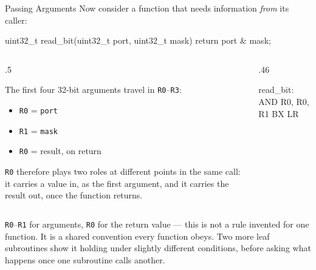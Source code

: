 \documentclass[9pt,aspectratio=169,xcolor=table]{beamer}
\begin{document}
\begin{frame}[fragile]{Passing Arguments}
	\leavevmode
	{\small Now consider a function that needs information \emph{from} its
	caller:}

	\begin{cc}
uint32_t read_bit(uint32_t port, uint32_t mask) {
    return port & mask;
}
\end{cc}

	\vspace{2mm}
	\begin{columns}[T]
		\begin{column}{.5\textwidth}
			{\small The first four 32-bit arguments travel in \texttt{R0}--\texttt{R3}:
			\begin{itemize}\itemsep1pt
				\item \texttt{R0} = \texttt{port}
				\item \texttt{R1} = \texttt{mask}
				\item \texttt{R0} = result, on return
			\end{itemize}

			\vspace{1mm}
			\texttt{R0} therefore plays two roles at different points in the
			same call: it carries a value \alert{in}, as the first argument,
			and it carries the result \alert{out}, once the function
			returns.}
		\end{column}
		\begin{column}{.46\textwidth}
			\begin{asm}[basicstyle=\small\ttfamily]
read_bit:
    AND   R0, R0, R1
    BX    LR
\end{asm}
		\end{column}
	\end{columns}

	\vspace{2mm}
	{\small \texttt{R0}--\texttt{R1} for arguments, \texttt{R0} for the return
	value --- this is not a rule invented for one function. It is a shared
	convention every function obeys. Two more leaf subroutines show it holding
	under slightly different conditions, before asking what happens once one
	subroutine calls another.}
\end{frame}
\end{document}
